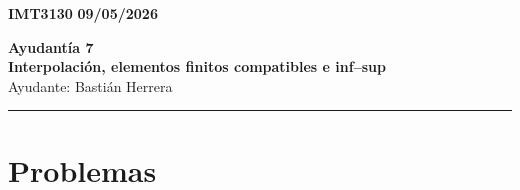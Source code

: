 \documentclass[11pt]{article}
\theoremstyle{thmstyle}
\begin{document}
    \begin{flushleft}
        \small
        \vspace{1pt}
        \textbf{IMT3130} \hfill
        \textbf{09/05/2026}
    \end{flushleft}
    \begin{center}
        \LARGE\textbf{Ayudant\'ia 7}\\
        \vspace{3pt}
        \normalsize\textbf{Interpolaci\'on, elementos finitos compatibles e inf--sup}\\
        \normalsize Ayudante: Basti\'an Herrera 
        \rule{\textwidth}{0.05mm}
    \end{center}

\section*{Problemas}
\end{document}
